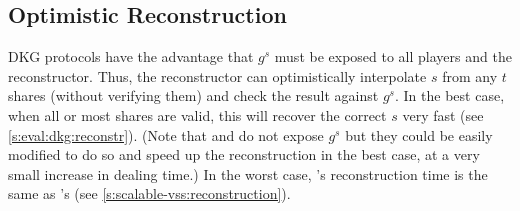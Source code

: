 \subsection{Optimistic Reconstruction}
\label{s:scalable-dkg:reconstr}
DKG protocols have the advantage that $g^s$ must be exposed to all players and the reconstructor.
Thus, the reconstructor can optimistically interpolate $s$ from any $t$ shares (without verifying them) and check the result against $g^s$.
In the best case, when all or most shares are valid, this will recover the correct $s$ very fast (see \cref{s:eval:dkg:reconstr}).
(Note that \ourvss and \evss do not expose $g^s$ but they could be easily modified to do so and speed up the reconstruction in the best case, at a very small increase in dealing time.)
In the worst case, \ourdkg's reconstruction time is the same as \ourvss's (see \cref{s:scalable-vss:reconstruction}).